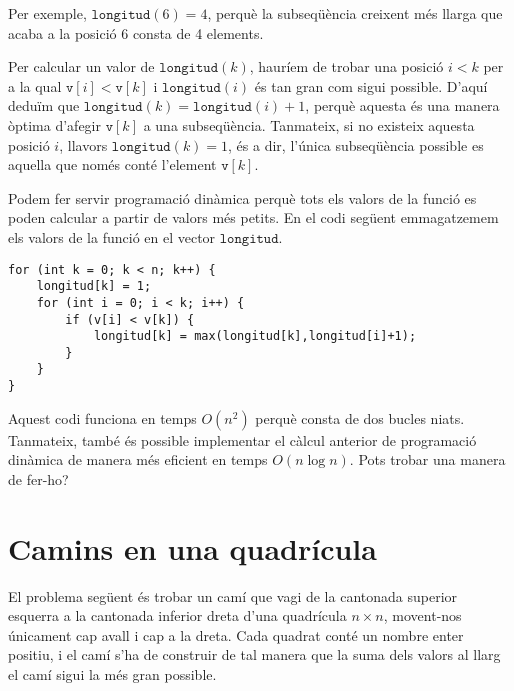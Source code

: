 Per exemple, $\texttt{longitud}(6)=4$,
perquè la subseqüència creixent més llarga
que acaba a la posició 6 consta de 4 elements.

Per calcular un valor de $\texttt{longitud}(k)$,
hauríem de trobar una posició $i<k$
per a la qual $\texttt{v}[i]<\texttt{v}[k]$
i $\texttt{longitud}(i)$ és tan gran com sigui possible.
D'aquí deduïm que
$\texttt{longitud}(k)=\texttt{longitud}(i)+1$,
perquè aquesta és una manera òptima d'afegir
$\texttt{v}[k]$ a una subseqüència.
Tanmateix, si no existeix aquesta posició $i$,
llavors $\texttt{longitud}(k)=1$,
és a dir, l'única subseqüència possible es aquella
que només conté l'element $\texttt{v}[k]$.

Podem fer servir programació dinàmica perquè tots els valors de la
funció es poden calcular a partir de valors més petits.
En el codi següent emmagatzemem els valors de la funció en
el vector
$\texttt{longitud}$.

\begin{lstlisting}
for (int k = 0; k < n; k++) {
    longitud[k] = 1;
    for (int i = 0; i < k; i++) {
        if (v[i] < v[k]) {
            longitud[k] = max(longitud[k],longitud[i]+1);
        }
    }
}
\end{lstlisting}

Aquest codi funciona en temps $O(n^2)$
perquè consta de dos bucles niats.
Tanmateix, també és possible implementar el
càlcul anterior de programació dinàmica
de manera més eficient en temps $O(n \log n)$.
Pots trobar una manera de fer-ho?

\section{Camins en una quadrícula}

El problema següent és trobar un camí
que vagi de la cantonada superior esquerra a
la cantonada inferior dreta
d'una quadrícula $n \times n$, movent-nos únicament
cap avall i cap a la dreta.
Cada quadrat conté un nombre enter positiu,
i el camí s'ha de construir de tal manera
que la suma dels valors al llarg
el camí sigui la més gran possible.

